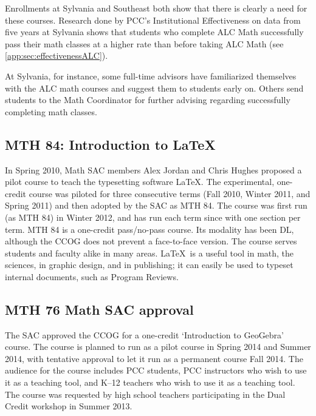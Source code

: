 Enrollments at Sylvania and Southeast both show that there is clearly a need for
these courses.  Research done by PCC's Institutional Effectiveness on data from
five years at Sylvania shows that students who complete ALC Math successfully
pass their math classes at a higher rate than before taking ALC Math  (see
\vref{app:sec:effectivenessALC}).


At Sylvania, for instance, some full-time advisors have familiarized themselves with the ALC math courses and
suggest them to students early on.  Others send students to the Math Coordinator for
further advising regarding successfully completing math classes.

\subsection{MTH 84: Introduction to \LaTeX}\label{other:sec:mth84}
In Spring 2010, Math SAC members Alex Jordan and Chris Hughes proposed a pilot
course to teach the typesetting software \LaTeX.  The experimental, one-credit course was piloted for
three consecutive terms (Fall 2010, Winter 2011, and Spring 2011) and then
adopted by the SAC as MTH 84.  The course was first run (as MTH 84) in Winter
2012, and has run each term since with one section per term. MTH 84 is a one-credit
pass/no-pass course. Its modality has been DL, although the CCOG does not
prevent a face-to-face version.  The course serves students and faculty alike in many areas.
\LaTeX\ is a useful tool in math, the sciences, in graphic design, and in
publishing; it can easily be used to typeset internal documents, such as Program Reviews.

\subsection{MTH 76 Math SAC approval}
The SAC approved the CCOG for a one-credit `Introduction to GeoGebra' course. The course is
planned to run as a pilot course in Spring 2014 and Summer 2014, with tentative
approval to let it run as a permanent course Fall 2014.  The audience for the
course includes PCC students, PCC instructors who wish to use it as a teaching
tool, and K--12 teachers who wish to use it as a teaching tool.  The course was
requested by high school teachers participating in the Dual Credit workshop in Summer 2013.

